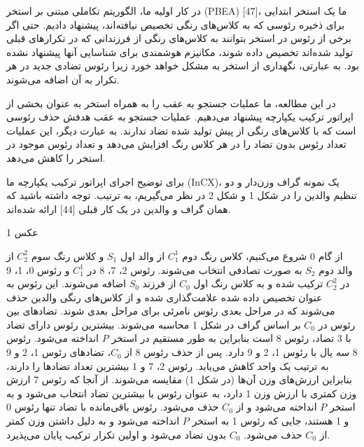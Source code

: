 \documentclass[a4paper,10pt]{article}
\begin{document}
                در کار اولیه ما، الگوریتم تکاملی مبتنی بر استخر (PBEA) [47]، ما یک استخر ابتدایی برای ذخیره رئوسی که به کلاس‌های رنگی تخصیص نیافته‌اند، پیشنهاد دادیم. حتی اگر برخی از رئوس در استخر بتوانند به کلاس‌های رنگی از فرزندانی که در تکرارهای قبلی تولید شده‌اند تخصیص داده شوند، مکانیزم هوشمندی برای شناسایی آنها پیشنهاد نشده بود. به عبارتی، نگهداری از استخر به مشکل خواهد خورد زیرا رئوس تضادی جدید در هر تکرار به آن اضافه می‌شوند.

                در این مطالعه، ما عملیات جستجو به عقب را به همراه استخر به عنوان بخشی از اپراتور ترکیب یکپارچه پیشنهاد می‌دهیم. عملیات جستجو به عقب هدفش حذف رئوسی است که با کلاس‌های رنگی از پیش تولید شده تضاد ندارند. به عبارت دیگر، این عملیات تعداد رئوس بدون تضاد را در هر کلاس رنگ افزایش می‌دهد و تعداد رئوس موجود در استخر را کاهش می‌دهد.

                برای توضیح اجرای اپراتور ترکیب یکپارچه ما (InCX)، یک نمونه گراف وزن‌دار و دو تنظیم والدین را در شکل 1 و شکل 2 در نظر می‌گیریم، به ترتیب. توجه داشته باشید که همان گراف و والدین در یک کار قبلی [44] ارائه شده‌اند.

                عکس 1

                از گام 0 شروع می‌کنیم، کلاس رنگ دوم $C_1^1$ از والد اول $S_1$ و کلاس رنگ سوم $C_2^2$ از والد دوم $S_2$ به صورت تصادفی انتخاب می‌شوند. رئوس 2، 7، 8 در $C_1^1$ و رئوس 0، 1، 9 در $C_2^2$ ترکیب شده و به کلاس رنگ اول $C_0$ از فرزند $S_0$ اضافه می‌شوند. این رئوس به عنوان تخصیص داده شده علامت‌گذاری شده و از کلاس‌های رنگی والدین حذف می‌شوند که در مراحل بعدی رئوس نامرئی برای مراحل بعدی شوند. تضادهای بین رئوس در $C_0$ بر اساس گراف در شکل 1 محاسبه می‌شوند. بیشترین رئوس دارای تضاد با 3 تضاد، رئوس 8 است بنابراین به طور مستقیم در استخر $P$ انداخته می‌شود. رئوس 8 سه یال با رئوس 1، 2 و 9 دارد. پس از حذف رئوس 8 از $C_0$، تضادهای رئوس 1، 2 و 9 به ترتیب یک واحد کاهش می‌یابد. رئوس 2، 7 و 1 بیشترین تعداد تضادها را دارند، بنابراین ارزش‌های وزن آن‌ها (در شکل 1) مقایسه می‌شوند. از آنجا که رئوس 7 ارزش وزن کمتری با ارزش وزن 1 دارد، به عنوان رئوس با بیشترین تضاد انتخاب می‌شود و به استخر $P$ انداخته می‌شود و از $C_0$ حذف می‌شود. رئوس باقی‌مانده با تضاد تنها رئوس 0 و 1 هستند، جایی که رئوس 1 به استخر $P$ انداخته می‌شود و به دلیل داشتن وزن کمتر از $C_0$ حذف می‌شود. $C_0$ بدون تضاد می‌شود و اولین تکرار ترکیب پایان می‌پذیرد.
\end{document}
